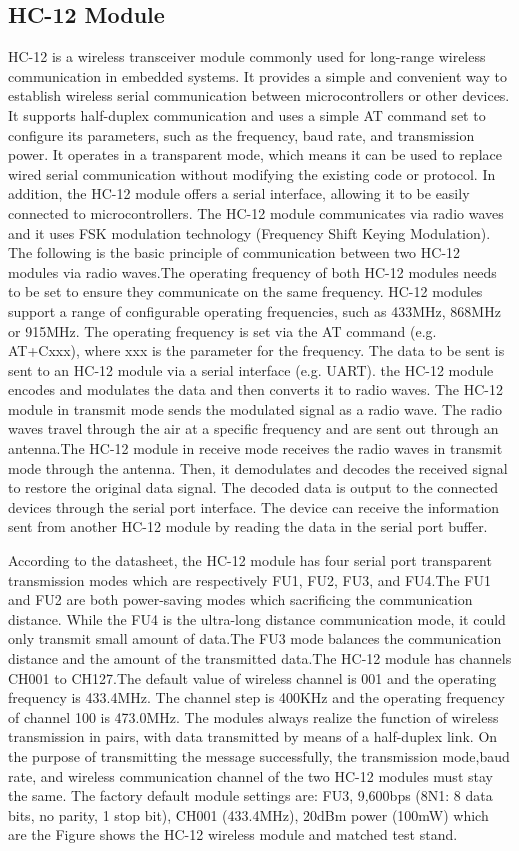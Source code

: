 \documentclass[12pt, a4paper, oneside]{report}
\begin{document}
\subsection{HC-12 Module}
HC-12 is a wireless transceiver module commonly used for long-range wireless communication in embedded systems. It provides a simple and convenient way to establish wireless serial communication between microcontrollers or other devices. It supports half-duplex communication and uses a simple AT command set to configure its parameters, such as the frequency, baud rate, and transmission power. It operates in a transparent mode, which means it can be used to replace wired serial communication without modifying the existing code or protocol. In addition, the HC-12 module offers a serial interface, allowing it to be easily connected to microcontrollers. The HC-12 module communicates via radio waves and it uses FSK modulation technology (Frequency Shift Keying Modulation). The following is the basic principle of communication between two HC-12 modules via radio waves.The operating frequency of both HC-12 modules needs to be set to ensure they communicate on the same frequency. HC-12 modules support a range of configurable operating frequencies, such as 433MHz, 868MHz or 915MHz. The operating frequency is set via the AT command (e.g. AT+Cxxx), where xxx is the parameter for the frequency. The data to be sent is sent to an HC-12 module via a serial interface (e.g. UART). the HC-12 module encodes and modulates the data and then converts it to radio waves. The HC-12 module in transmit mode sends the modulated signal as a radio wave. The radio waves travel through the air at a specific frequency and are sent out through an antenna.The HC-12 module in receive mode receives the radio waves in transmit mode through the antenna. Then, it demodulates and decodes the received signal to restore the original data signal. The decoded data is output to the connected devices through the serial port interface. The device can receive the information sent from another HC-12 module by reading the data in the serial port buffer. 

According to the datasheet, the HC-12 module has four serial port transparent transmission modes which are respectively FU1, FU2, FU3, and FU4.The FU1 and FU2 are both power-saving modes which sacrificing the communication distance. While the FU4 is the ultra-long distance communication mode, it could only transmit small amount of data.The FU3 mode balances the communication distance and the amount of the transmitted data.The HC-12 module has channels CH001 to CH127.The default value of wireless channel is 001 and the operating frequency is 433.4MHz. The channel step is 400KHz and the operating frequency of channel 100 is 473.0MHz. The modules always realize the function of wireless transmission in pairs, with data transmitted by means of a half-duplex link. On the purpose of transmitting the message successfully, the transmission mode,baud rate, and wireless communication channel of the two HC-12 modules must stay the same. The factory default module settings are: FU3, 9,600bps (8N1: 8 data bits, no parity, 1 stop bit), CH001 (433.4MHz), 20dBm power (100mW) which are the Figure shows the HC-12 wireless module and matched test stand.
\end{document}
